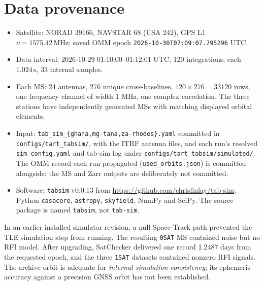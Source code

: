 \documentclass[11pt,a4paper]{article}
\begin{document}
\section{Data provenance}
\begin{itemize}
\item Satellite: NORAD 39166, NAVSTAR 68 (USA 242), GPS L1
$\nu=1575.42\,\mathrm{MHz}$; saved OMM epoch
\texttt{2026-10-30T07:09:07.795296} UTC.
\item Data interval: 2026-10-29 01:10:00--01:12:01 UTC;
120 integrations, each $1.024\,\mathrm{s}$, $33$ internal samples.
\item Each MS: 24 antennas, 276 unique cross-baselines,
$120\times276=33120$ rows, one frequency channel of width $1$ MHz,
one complex correlation. The three stations have independently
generated MSs with matching displayed orbital elements.
\item Input: \texttt{tab\_sim\_\{ghana,mg-tana,za-rhodes\}.yaml}
committed in \texttt{configs/tart\_tabsim/}, with the ITRF antenna files,
and each run's resolved \texttt{sim\_config.yaml} and tab-sim log under
\texttt{configs/tart\_tabsim/simulated/}.
The OMM record each run propagated (\texttt{used\_orbits.json}) is
committed alongside; the MS and Zarr outputs are deliberately not committed.
\item Software: \texttt{tabsim} v0.0.13 from
\url{https://github.com/chrisfinlay/tab-sim}; Python \texttt{casacore},
\texttt{astropy}, \texttt{skyfield}, NumPy and SciPy.
The source package is named \texttt{tabsim}, not \texttt{tab-sim}.
\end{itemize}
In an earlier installed simulator revision, a null Space-Track path prevented
the TLE simulation step from running. The resulting \texttt{0SAT} MS
contained noise but no RFI model. After upgrading, SatChecker delivered
one record 1.2487 days from the requested epoch, and the three \texttt{1SAT}
datasets contained nonzero RFI signals. The archive orbit is adequate for
\emph{internal simulation consistency}; its ephemeris accuracy against a
precision GNSS orbit has not been established.
\end{document}
